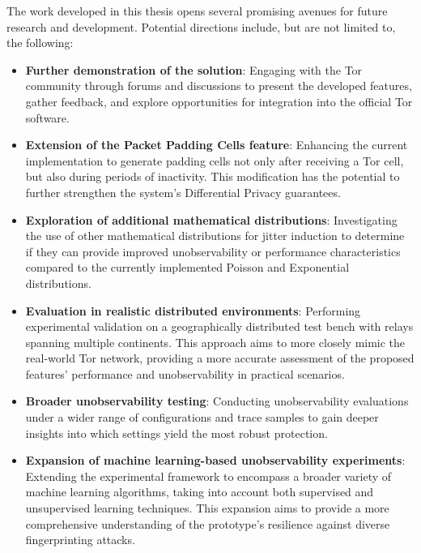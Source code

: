 The work developed in this thesis opens several promising avenues for future research and development. Potential directions include, but are not limited to, the following:
\begin{itemize}
    \item \textbf{Further demonstration of the solution}: Engaging with the Tor community through forums and discussions to present the developed features, gather feedback, and explore opportunities for integration into the official Tor software.
    \item \textbf{Extension of the Packet Padding Cells feature}: Enhancing the current implementation to generate padding cells not only after receiving a Tor cell, but also during periods of inactivity. This modification has the potential to further strengthen the system's Differential Privacy guarantees.
    \item \textbf{Exploration of additional mathematical distributions}: Investigating the use of other mathematical distributions for jitter induction to determine if they can provide improved unobservability or performance characteristics compared to the currently implemented Poisson and Exponential distributions.
    \item \textbf{Evaluation in realistic distributed environments}: Performing experimental validation on a geographically distributed test bench with relays spanning multiple continents. This approach aims to more closely mimic the real-world Tor network, providing a more accurate assessment of the proposed features' performance and unobservability in practical scenarios.
    \item \textbf{Broader unobservability testing}: Conducting unobservability evaluations under a wider range of configurations and trace samples to gain deeper insights into which settings yield the most robust protection.
    \item \textbf{Expansion of machine learning-based unobservability experiments}: Extending the experimental framework to encompass a broader variety of machine learning algorithms, taking into account both supervised and unsupervised learning techniques. This expansion aims to provide a more comprehensive understanding of the prototype's resilience against diverse fingerprinting attacks.
\end{itemize}